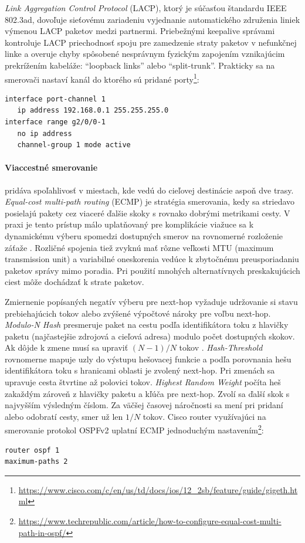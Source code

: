 \documentclass[12pt, a4paper]{article}
\begin{document}
\emph{Link Aggregation Control Protocol} (LACP), ktorý je súčasťou štandardu IEEE 802.3ad, dovoľuje 
sieťovému zariadeniu vyjednanie automatického združenia liniek výmenou LACP paketov medzi partnermi.
Priebežnými keepalive správami kontroluje LACP priechodnosť spoju pre zamedzenie straty paketov
v nefunkčnej linke a overuje chyby spôsobené nesprávnym fyzickým zapojením vznikajúcim prekrížením 
kabeláže: \enquote{loopback links} alebo \enquote{split-trunk}. Prakticky sa na smerovači nastaví kanál do 
ktorého sú pridané porty\footnote{\url{https://www.cisco.com/c/en/us/td/docs/ios/12_2sb/feature/guide/gigeth.html}}:
\begin{lstlisting}
interface port-channel 1
   ip address 192.168.0.1 255.255.255.0
interface range g2/0/0-1
   no ip address
   channel-group 1 mode active
\end{lstlisting}

\paragraph{Viaccestné smerovanie} pridáva spoľahlivosť v miestach, kde vedú do cieľovej destinácie aspoň
dve trasy. \emph{Equal-cost multi-path routing} (ECMP) je stratégia smerovania, kedy sa striedavo posielajú 
pakety cez viaceré ďalšie skoky s rovnako dobrými metrikami cesty. V praxi je tento prístup málo 
uplatňovaný pre komplikácie viažuce sa k dynamickému výberu spomedzi dostupných smerov na rovnomerné 
rozloženie záťaže \cite{RFC2991}. Rozličné spojenia tiež zvyknú mať rôzne veľkosti MTU (maximum transmission 
unit) a variabilné oneskorenia vedúce k zbytočnému preusporiadaniu paketov správy mimo poradia. Pri použití 
mnohých alternatívnych preskakujúcich ciest môže dochádzať k strate paketov. 

Zmiernenie popísaných negatív výberu pre next-hop vyžaduje udržovanie si 
stavu prebiehajúcich tokov alebo zvýšené výpočtové nároky pre voľbu next-hop. \emph{Modulo-N Hash} 
presmeruje paket na cestu podľa identifikátora toku z hlavičky paketu (najčastejšie zdrojová a cieľová 
adresa) modulo počet dostupných skokov. Ak dôjde k zmene musí sa upraviť $(N-1)/N$ tokov
 \cite{RFC2991}. \emph{Hash-Threshold} rovnomerne mapuje uzly do výstupu hešovacej funkcie a podľa 
porovnania hešu identifikátora toku s hranicami oblasti je zvolený next-hop. Pri zmenách sa upravuje cesta 
štvrtine až polovici tokov. \emph{Highest Random Weight} počíta heš zakaždým zároveň z hlavičky paketu a
kľúča pre next-hop. Zvolí sa ďalší skok s najvyšším výsledným číslom. Za väčšej časovej náročnosti
sa mení pri pridaní alebo odobratí cesty, smer už len $1/N$ tokov. Cisco router využívajúci na smerovanie
protokol OSPFv2 uplatní ECMP jednoduchým nastavením\footnote{\url{https://www.techrepublic.com/article/how-to-configure-equal-cost-multi-path-in-ospf/}}:
\begin{lstlisting}
router ospf 1
maximum-paths 2
\end{lstlisting}
\end{document}
